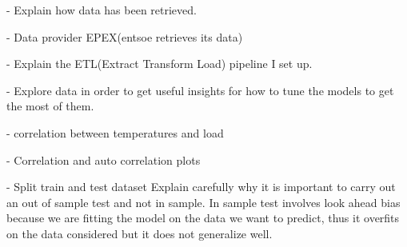 - Explain how data has been retrieved.

- Data provider EPEX(entsoe retrieves its data)

- Explain the ETL(Extract Transform Load) pipeline
I set up.

- Explore data in order to get useful insights for
how to tune the models to get the most of them.

- correlation between temperatures and load

- Correlation and auto correlation plots

- Split train and test dataset
Explain carefully why it is important to carry
out an out of sample test and not in sample.
In sample test involves look ahead bias because we are
fitting the model on the data we want to predict,
thus it overfits on the data considered but it does
not generalize well.
